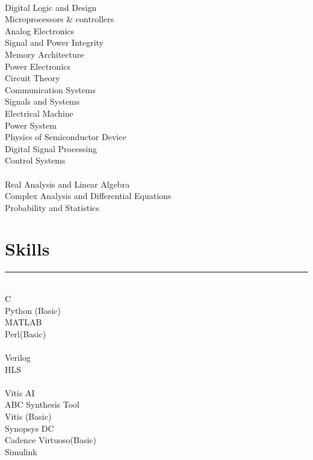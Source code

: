\documentclass[]{resume}
\begin{document}
\begin{minipage}[t]{0.3\textwidth}
\vspace{-0.7em}
\\
Digital Logic and Design\\
Microprocessors \& controllers\\
Analog Electronics\\
Signal and Power Integrity\\
Memory Architecture\\
Power Electronics\\
Circuit Theory\\
Communication Systems\\
Signals and Systems\\
Electrical Machine\\
Power System\\
Physics of Semiconductor Device\\
Digital Signal Processing\\
Control Systems\\

\vspace{-0.5em}
\\
Real Analysis and Linear Algebra\\
Complex Analysis and Differential Equations\\
Probability and Statistics\\
\sectionsep
\vspace{-1.5em}

\section{Skills}
\vspace{-0.5em}
\noindent\rule{5.2cm}{0.4pt}

\vspace{0.5em}
\\
C\\
Python (Basic)\\
MATLAB\\
Perl(Basic)\\

\vspace{-0.5em}
\\
Verilog\\
HLS\\

\vspace{-0.5em}
\\
Vitis AI\\
ABC Synthesis Tool \\
Vitis (Basic) \\
Synopsys DC\\
Cadence Virtuoso(Basic)\\
Simulink\\


\end{minipage}
\end{document}
